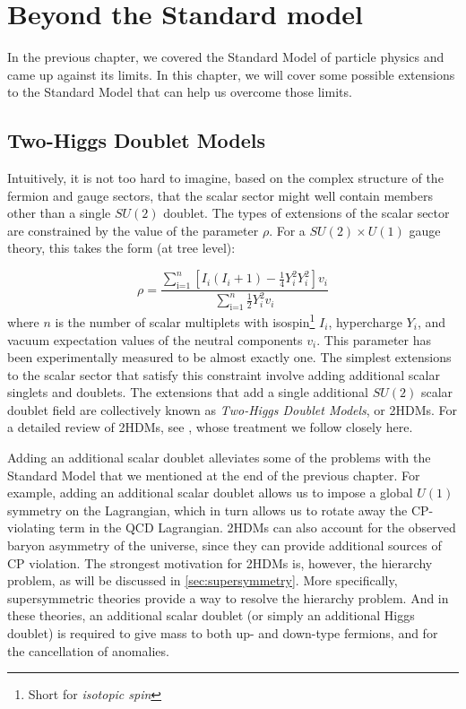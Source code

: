 \chapter{Beyond the Standard model}\label{ch:bsm}

In the previous chapter, we covered the Standard Model of particle physics and came up against its limits. In this chapter, we will cover some possible extensions to the Standard Model that can help us overcome those limits.

\section{Two-Higgs Doublet Models}

Intuitively, it is not too hard to imagine, based on the complex structure of the fermion and gauge sectors, that the scalar sector might well contain members other than a single $SU(2)$ doublet. The types of extensions of the scalar sector are constrained by the value of the parameter $\rho$. For a $SU(2)\times U(1)$ gauge theory, this takes the form (at tree level):

\begin{equation}
\rho = \frac{\sum_\text{i=1}^n\left[I_i(I_i+1)-\frac{1}{4}Y_i^2Y_i^2\right]v_i}{\sum_\text{i=1}^n\frac{1}{2}Y_i^2v_i}
\end{equation}
where $n$ is the number of scalar multiplets with isospin\footnote{Short for \emph{isotopic spin}} $I_i$, hypercharge $Y_i$, and vacuum expectation values of the neutral components $v_i$. This parameter has been experimentally measured to be almost exactly one. The simplest extensions to the scalar sector that satisfy this constraint involve adding additional scalar singlets and doublets. The extensions that add a single additional $SU(2)$ scalar doublet field are collectively known as \emph{Two-Higgs Doublet Models}, or 2HDMs. For a detailed review of 2HDMs, see \citep{Branco2012}, whose treatment we follow closely here.

Adding an additional scalar doublet alleviates some of the problems with the Standard Model that we mentioned at the end of the previous chapter. For example, adding an additional scalar doublet allows us to impose a global $U(1)$ symmetry on the Lagrangian, which in turn allows us to rotate away the CP-violating term in the QCD Lagrangian. 2HDMs can also account for the observed baryon asymmetry of the universe, since they can provide additional sources of CP violation. The strongest motivation for 2HDMs is, however, the hierarchy problem, as will be discussed in \autoref{sec:supersymmetry}. More specifically, supersymmetric theories provide a way to resolve the hierarchy problem. And in these theories, an additional scalar doublet (or simply an additional Higgs doublet) is required to give mass to both up- and down-type fermions, and for the cancellation of anomalies.

